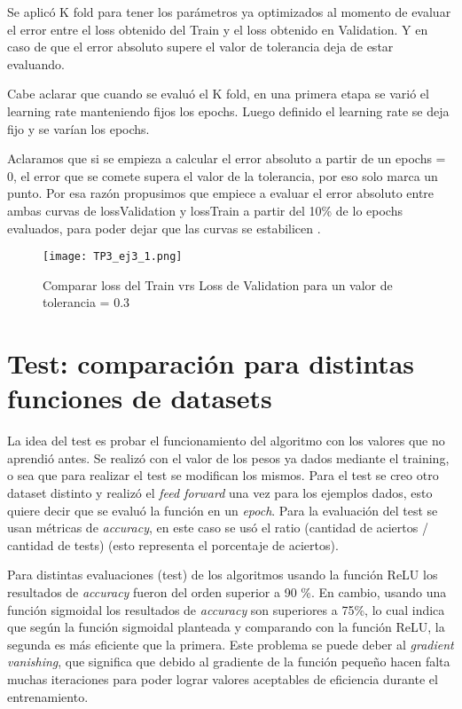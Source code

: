 \documentclass{article}
\begin{document}
Se aplicó K fold para tener los parámetros ya optimizados al momento de evaluar el error entre el loss obtenido del Train y el loss obtenido en Validation. Y en caso de que el error absoluto supere el valor de tolerancia deja de estar evaluando. 

Cabe aclarar que cuando se evaluó el K fold, en una primera etapa se varió el learning rate manteniendo fijos los epochs. Luego definido el learning rate se deja fijo y se varían los epochs.

Aclaramos que si se empieza a calcular el error absoluto a partir de un epochs = 0, el error que se comete supera el valor de la tolerancia, por eso solo marca un punto. Por esa razón propusimos que empiece a evaluar el error absoluto entre ambas curvas de lossValidation y lossTrain a partir del 10\% de lo epochs evaluados, para poder dejar que las curvas se estabilicen . 

\begin{figure}[ht]
    \centering
    \texttt{[image: TP3\_ej3\_1.png]}
    \caption{Comparar loss del Train vrs Loss de Validation para un valor de tolerancia = 0.3}
    \label{fig:TP3_ej3_1}
\end{figure}

\section{Test: comparación para distintas funciones de datasets}
La idea del test es probar el funcionamiento del algoritmo con los valores que no aprendió antes. Se realizó con el valor de los pesos ya dados mediante el training, o sea que para realizar el test se modifican los mismos. Para el test se creo otro dataset distinto y realizó el \textit{feed forward} una vez para los ejemplos dados, esto quiere decir que se evaluó la función en un \textit{epoch}. Para la evaluación del test se usan métricas de \textit{accuracy}, en este caso se usó el ratio (cantidad de aciertos / cantidad de tests) (esto representa el porcentaje de aciertos). 

Para distintas evaluaciones (test) de los algoritmos usando la función ReLU los resultados de \textit{accuracy} fueron  del orden superior a 90 \%. En cambio, usando una función sigmoidal los resultados de \textit{accuracy} son superiores a 75\%, lo cual indica que según la función sigmoidal planteada y comparando con la función ReLU, la segunda es más eficiente que la primera. Este problema se puede deber al \textit{gradient vanishing}, que significa que debido al gradiente de la función pequeño hacen falta muchas iteraciones para poder lograr valores aceptables de eficiencia durante el entrenamiento.
\end{document}
